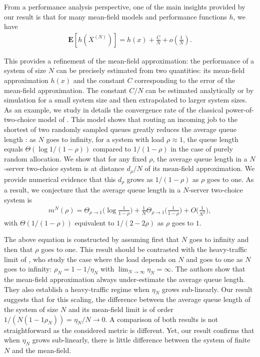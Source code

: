 \documentclass[sigconf]{acmart}
\newcommand\XN{X^{(N)}}
\newcommand\esp[1]{\mathbf{E}\left[#1\right]}
\newcommand\p[1]{\left(#1\right)}
\begin{document}
From a performance analysis perspective, one of the main insights
provided by our result is that for many mean-field models and
performance functions $h$, we have
\begin{align}
  \label{eq:C/N}
  \esp{h(\XN)} = h(x)+\frac{C}{N} + o\p{\frac1N}.
\end{align}

This provides a refinement of the mean-field approximation: the
performance of a system of size $N$ can be precisely estimated from
two quantities: its mean-field approximation $h(x)$ and the constant
$C$ corresponding to the error of the mean-field approximation. The
constant $C/N$ can be estimated analytically or by simulation for a
small system size and then extrapolated to larger system sizes.  As an
example, we study in details the convergence rate of the classical
power-of-two-choice model of
\cite{mitzenmacher1996power,vvedenskaya1996queueing}. This model shows
that routing an incoming job to the shortest of two randomly sampled
queues greatly reduces the average queue length : as $N$ goes to
infinity, for a system with load $\rho\approx1$, the queue length
equals $\Theta(\log 1/(1-\rho))$ compared to $1/(1-\rho)$ in the case
of purely random allocation. We show that for any fixed $\rho$, the
average queue length in a $N$-server two-choice system is at distance
$d_\rho/N$ of its mean-field approximation. We provide numerical
evidence that this $d_\rho$ grows as $1/(1-\rho)$ as $\rho$ goes to
one. As a result, we conjecture that the average queue length in a
$N$-server two-choice system is 
\begin{align*}
  m^N(\rho) = \Theta_{\rho\to1}\Big(\log\frac1{1-\rho}\Big)
  + \frac{1}{N}\Theta_{\rho\to1}\Big(\frac{1}{1-\rho}\Big) +
  O\Big(\frac1{N^2}\Big),
\end{align*}
with $\Theta(1/(1-\rho))$ equivalent to $1/(2-2\rho)$ as $\rho$
goes to $1$.

The above equation is constructed by assuming first that $N$ goes to
infinity and then that $\rho$ goes to one. This result should be
contrasted with the heavy-traffic limit of
\cite{eschenfeldt2016supermarket}, who study the case where the load
depends on $N$ and goes to one as $N$ goes to infinity:
$\rho_N=1-1/\eta_N$ with $\lim_{N\to\infty}\eta_N=\infty$. The authors
show that the mean-field approximation always under-estimate the
average queue length.  They also establish a heavy-traffic regime when
$\eta_N$ grows sub-linearly.  Our result suggests that for this
scaling, the difference between the average queue length of the system
of size $N$ and its mean-field limit is of order
$1/(N(1-1\rho_N))=\eta_N/N\to0$. A comparison of both results is not
straightforward as the considered metric is different. Yet, our result
confirms that when $\eta_N$ grows sub-linearly, there is little
difference between the system of finite $N$ and the mean-field.
\end{document}
